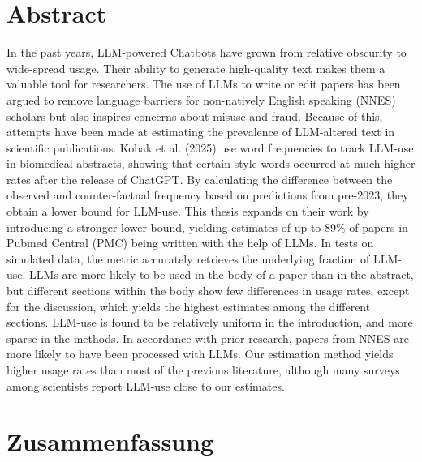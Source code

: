 \documentclass[12pt,a4paper]{report}
\begin{document}
\chapter*{Abstract}
In the past years, LLM-powered Chatbots have grown from relative obscurity to wide-spread usage. Their ability to generate high-quality text makes them a valuable tool for researchers. The use of LLMs to write or edit papers has been argued to remove language barriers for non-natively English speaking (NNES) scholars but also inspires concerns about misuse and fraud.  Because of this, attempts have been made at estimating the prevalence of LLM-altered text in scientific publications. Kobak et al. (2025) use word frequencies to track LLM-use in biomedical abstracts, showing that certain style words occurred at much higher rates after the release of ChatGPT. By calculating the difference between the observed and counter-factual frequency based on predictions from pre-2023, they obtain a lower bound for LLM-use. This thesis expands on their work by introducing a stronger lower bound, yielding estimates of up to 89\% of papers in Pubmed Central (PMC) being written with the help of LLMs. In tests on simulated data, the metric accurately retrieves the underlying fraction of LLM-use. LLMs are more likely to be used in the body of a paper than in the abstract, but different sections within the body show few differences in usage rates, except for the discussion, which yields the highest estimates among the different sections. LLM-use is found to be relatively uniform in the introduction, and more sparse in the methods. In accordance with prior research, papers from NNES are more likely to have been processed with LLMs. Our estimation method yields higher usage rates than most of the previous literature, although many surveys among scientists report LLM-use close to our estimates. 



\chapter*{Zusammenfassung}
\end{document}
